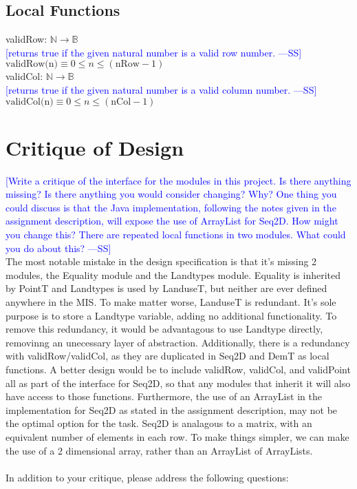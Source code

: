 \documentclass[12pt]{article}
\newcommand{\authornote}[3]{\textcolor{#1}{[#3 ---#2]}}
\newcommand{\authornote}[3]{}
\newcommand{\wss}[1]{\authornote{blue}{SS}{#1}}
\begin{document}
\subsection*{Local Functions}

\noindent validRow: $\mathbb{N} \rightarrow \mathbb{B}$\\
\noindent \wss{returns true if the given natural number is a valid row
  number.}\\
$\mbox{validRow(n)} \equiv 0 \leq n \leq (\mbox{nRow} - 1)$\\

\noindent validCol: $\mathbb{N} \rightarrow \mathbb{B}$\\
\noindent \wss{returns true if the given natural number is a valid column
  number.}\\
$\mbox{validCol(n)} \equiv 0 \leq n \leq (\mbox{nCol} - 1)$\\

\newpage

\section*{Critique of Design}

\wss{Write a critique of the interface for the modules in this project.  Is there
anything missing?  Is there anything you would consider changing?  Why?  One
thing you could discuss is that the Java implementation, following the notes
given in the assignment description, will expose the use of ArrayList for Seq2D.
 How might you change this?  There are repeated local functions in two modules.
What could you do about this?}\\

The most notable mistake in the design specification is that it's missing 2 modules, the Equality module and the Landtypes module.
Equality is inherited by PointT and Landtypes is used by LanduseT, but neither are ever defined anywhere in the MIS. To make matter worse,
LanduseT is redundant. It's sole purpose is to store a Landtype variable, adding no additional functionality.
To remove this redundancy, it would be advantagous to use Landtype directly, removinng an unecessary layer of abstraction.
Additionally, there is a redundancy with validRow/validCol, as they are duplicated in Seq2D and DemT as local functions.
A better design would be to include validRow, validCol, and validPoint all as part of the interface for
Seq2D, so that any modules that inherit it will also have access to those functions.
Furthermore, the use of an ArrayList in the implementation for Seq2D as stated in the assignment description,
may not be the optimal option for the task. Seq2D is analagous to a matrix, with an equivalent number of
elements in each row. To make things simpler, we can make the use of a 2 dimensional array, rather than an ArrayList of ArrayLists.
\\\\
In addition to your critique, please address the following questions:
\end{document}
